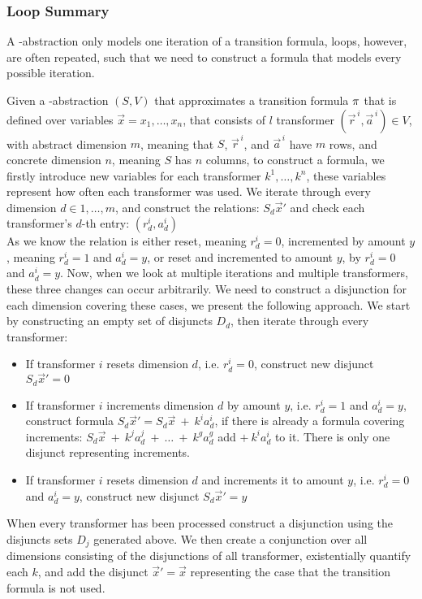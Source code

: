\subsubsection{\qvasr Loop Summary}
A \qvasr-abstraction only models one iteration of a transition formula, loops, however, are often repeated, such that we need to construct a formula that models every possible iteration. \\ \par
Given a \qvasr-abstraction $(S, V)$ that approximates a transition formula $\pi$ that is defined over variables $\vec{x} = x_1, \ldots, x_n$,  that consists of $l$ transformer $(\vec{r}^{\,i}, \vec{a}^{\,i}) \in V$, with abstract dimension $m$, meaning that $S$, $\vec{r}^{\, i}$, and $\vec{a}^{\, i}$ have $m$ rows, and concrete dimension $n$, meaning $S$ has $n$ columns, to construct a formula, we firstly introduce new variables for each transformer $k^1, \ldots, k^n$, these variables represent how often each transformer was used. We iterate through every dimension $d \in 1, \ldots, m$, and construct the relations: $S_d\vec{x}'$ and check each transformer's $d$-th entry: $(r_d^i, a_d^i)$ \\
As we know the relation is either reset, meaning $r_d^i = 0$, incremented by amount $y$, meaning $r_d^i = 1$ and $a_d^i = y$, or reset and incremented to amount $y$, by $r_d^i = 0$ and $a_d^i = y$. Now, when we look at multiple iterations and multiple transformers, these three changes can occur arbitrarily. We need to construct a disjunction for each dimension covering these cases, we present the following approach.
We start by constructing an empty set of disjuncts $D_d$, then iterate through every transformer:
\begin{itemize}
	\item If transformer $i$ resets dimension $d$, i.e. $r_d^i = 0$, construct new disjunct $S_d\vec{x}' = 0$
	\item If transformer $i$ increments dimension $d$ by amount $y$, i.e. $r_d^i = 1$ and $a_d^i = y$, construct formula $S_d\vec{x}' = S_d\vec{x}\ +\ k^ia_d^i$, if there is already a formula covering increments:  $S_d\vec{x}\ +\ k^ja_d^j\ +\ \ldots\ +\ k^ga_d^g$ add $+\ k^ia_d^i$ to it. There is only one disjunct representing increments.
	\item If transformer $i$ resets dimension $d$ and increments it to amount $y$, i.e. $r_d^i = 0$ and $a_d^i = y$, construct new disjunct $S_d\vec{x}' = y$
\end{itemize}
When every transformer has been processed construct a disjunction using the disjuncts sets $D_j$ generated above. We then create a conjunction over all dimensions consisting of the disjunctions of all transformer, existentially quantify each $k$, and add the disjunct $\vec{x}' = \vec{x}$ representing the case that the transition formula is not used.

